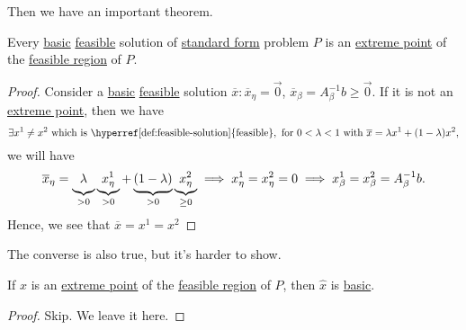 Then we have an important theorem.
\begin{theorem}\label{thm:lec5-1}
	Every \hyperref[def:basic-solution]{basic} \hyperref[def:feasible-solution]{feasible} solution of \hyperref[def:standard-form]{standard form} problem \(P\) is an
	\hyperref[def:extreme-point]{extreme point} of the \hyperref[def:feasible-region]{feasible region} of \(P\).
\end{theorem}
\begin{proof}
	Consider a \hyperref[def:basic-solution]{basic} \hyperref[def:feasible-solution]{feasible} solution \(\overline{x}\colon \overline{x}_{\eta} = \vec{0}\),
	\(\overline{x}_{\beta} = A^{-1}_{\beta}b\geq \vec{0}\). If it is not an \hyperref[def:extreme-point]{extreme point}, then we have
	\[
		\exists x^1\neq x^2 \text{ which is \hyperref[def:feasible-solution]{feasible}}, \text{ for }0<\lambda<1\text{ with }\overline{x} = \lambda x^1 + (1-\lambda)x^2,
	\]
	we will have
	\[
		\overline{x}_{\eta} = \underbrace{\vphantom{x^1_{\eta}}\lambda}_{>0}\underbrace{x^1_{\eta}}_{>0} + \underbrace{\vphantom{x^1_{\eta}}(1-\lambda)}_{>0}\underbrace{x^2_{\eta}}_{\geq 0} \implies x^1_{\eta} = x^2_{\eta} = 0 \implies x^1_{\beta} = x^2_{\beta} = A^{-1}_{\beta}b.
	\]
	Hence, we see that \(\overline{x} = x^1 = x^2\)\conta
\end{proof}

The converse is also true, but it's harder to show.
\begin{theorem}\label{thm:lec5-2}
	If \(\hat{x}\) is an \hyperref[def:extreme-point]{extreme point} of the \hyperref[def:feasible-region]{feasible region} of \(P\), then \(\hat{x}\) is
	\hyperref[def:basic-solution]{basic}.
\end{theorem}
\begin{proof}
	Skip. We leave it here.
\end{proof}

